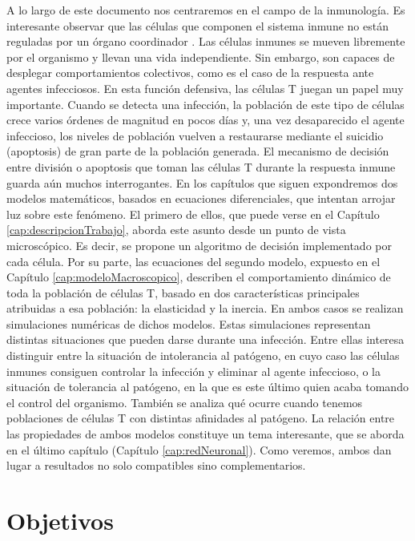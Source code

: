 A lo largo de este documento nos centraremos en el campo de la inmunología. Es interesante observar que las células que componen el sistema inmune no están reguladas por un órgano coordinador \citep{arias2016emergent}. Las células inmunes se mueven libremente por el organismo y llevan una vida independiente. Sin embargo, son capaces de desplegar comportamientos colectivos, como es el caso de la respuesta ante agentes infecciosos. En esta función defensiva, las células T juegan un papel muy importante. Cuando se detecta una infección, la población de este tipo de células crece varios órdenes de magnitud en pocos días y, una vez desaparecido el agente infeccioso, los niveles de población vuelven a restaurarse mediante el suicidio (apoptosis) de gran parte de la población generada. El mecanismo de decisión entre división o apoptosis que toman las células T durante la respuesta inmune guarda aún muchos interrogantes. En los capítulos que siguen expondremos dos modelos matemáticos, basados en ecuaciones diferenciales, que intentan arrojar luz sobre este fenómeno. El primero de ellos, que puede verse en el Capítulo \ref{cap:descripcionTrabajo}, aborda este asunto desde un punto de vista microscópico. Es decir, se propone un algoritmo de decisión implementado por cada célula. Por su parte, las ecuaciones del segundo modelo, expuesto en el Capítulo \ref{cap:modeloMacroscopico}, describen el comportamiento dinámico de toda la población de células T, basado en dos características principales  atribuidas a esa población: la elasticidad y la inercia. En ambos casos se realizan simulaciones numéricas de dichos modelos. Estas simulaciones representan distintas situaciones que pueden darse durante una infección. Entre ellas interesa distinguir entre la situación de intolerancia al patógeno, en cuyo caso las células inmunes consiguen controlar la infección y eliminar al agente infeccioso, o la situación de tolerancia al patógeno, en la que es este último quien acaba tomando el control del organismo. También se analiza qué ocurre cuando tenemos poblaciones de células T con distintas afinidades al patógeno. La relación entre las propiedades de ambos modelos constituye un tema interesante, que se aborda en el último capítulo (Capítulo \ref{cap:redNeuronal}). Como veremos, ambos dan lugar a resultados no solo compatibles sino complementarios. 


\section{Objetivos}

